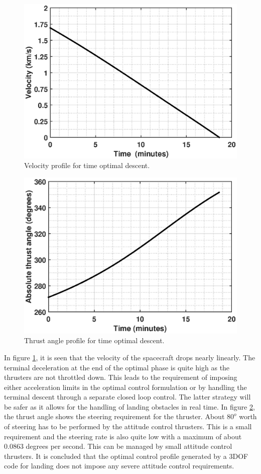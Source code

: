 \begin{figure}[H]
	\centering\includegraphics[width=0.90\linewidth]{Speed.eps}
	\caption{Velocity profile for time optimal descent.}
	\label{speed}
\end{figure}
\begin{figure}[H]
	\centering\includegraphics[width=0.9\linewidth]{Angle.eps}
	\caption{Thrust angle profile for time optimal descent.}
	\label{angle}
\end{figure}
In figure \ref{speed}, it is seen that the velocity of the spacecraft drops nearly linearly. The terminal deceleration at the end of the optimal phase is quite high as the thrusters are not throttled down. This leads to the requirement of imposing either acceleration limits in the optimal control formulation or by handling the terminal descent through a separate closed loop control. The latter strategy will be safer as it allows for the handling of landing obstacles in real time. In figure \ref{angle}, the thrust angle shows the steering requirement for the thruster. About $80^o$ worth of steering has to be performed by the attitude control thrusters. This is a small requirement and the steering rate is also quite low with a maximum of about $0.0863$ degrees per second. This can be managed by small attitude control thrusters. It is concluded that the optimal control profile generated by a 3DOF code for landing does not impose any severe attitude control requirements.
